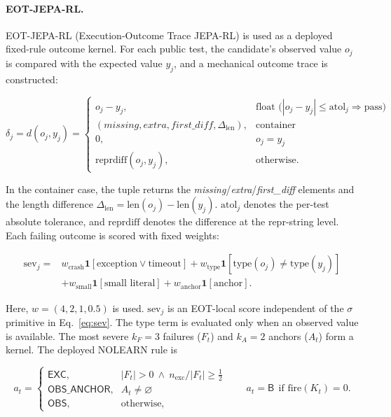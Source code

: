 \documentclass{article}
\numberwithin{equation}{section}  %
\theoremstyle{definition}
\newcommand{\armB}{\textsf{B}}
\begin{document}
\paragraph{EOT-JEPA-RL.}
EOT-JEPA-RL (Execution-Outcome Trace JEPA-RL) is used as a deployed fixed-rule outcome
kernel. For each public test, the candidate's observed value $o_j$ is compared with the
expected value $y_j$, and a mechanical outcome trace is constructed:

\begin{equation}\label{eq:eot-delta}
\delta_j=d(o_j,y_j)=
\begin{cases}
o_j-y_j,&\text{float (}|o_j-y_j|\le \mathrm{atol}_j\Rightarrow \text{pass)}\\[2pt]
(\textit{missing},\textit{extra},\textit{first\_diff},\Delta_{\mathrm{len}}),&\text{container}\\[2pt]
0,&o_j=y_j\\[2pt]
\mathrm{reprdiff}(o_j,y_j),&\text{otherwise.}
\end{cases}
\end{equation}

In the container case, the tuple returns the
\textit{missing}/\textit{extra}/\textit{first\_diff} elements and the length difference
$\Delta_{\mathrm{len}}=\mathrm{len}(o_j)-\mathrm{len}(y_j)$. $\mathrm{atol}_j$ denotes the
per-test absolute tolerance, and $\mathrm{reprdiff}$ denotes the difference at the repr-string
level. Each failing outcome is scored with fixed weights:

\begin{equation}\label{eq:eot-sev}
\begin{aligned}
\mathrm{sev}_j={}&w_{\mathrm{crash}}\mathbf{1}[\text{exception}\lor\text{timeout}]
+w_{\mathrm{type}}\mathbf{1}[\mathrm{type}(o_j)\!\ne\!\mathrm{type}(y_j)]\\
&+w_{\mathrm{small}}\mathbf{1}[\text{small literal}]
+w_{\mathrm{anchor}}\mathbf{1}[\text{anchor}] .
\end{aligned}
\end{equation}

Here, $w=(4,2,1,0.5)$ is used. $\mathrm{sev}_j$ is an EOT-local score independent of the
$\sigma$ primitive in Eq.~\eqref{eq:sev}. The type term is evaluated only when an observed
value is available. The most severe $k_F{=}3$ failures ($F_t$) and $k_A{=}2$ anchors
($A_t$) form a kernel. The deployed NOLEARN rule is

\begin{equation}\label{eq:eot-rule}
a_t=
\begin{cases}
\textsf{EXC},& |F_t|>0\ \wedge\ n_{\mathrm{exc}}/|F_t|\ge \tfrac{1}{2}\\[2pt]
\textsf{OBS\_ANCHOR},& A_t\ne\varnothing\\[2pt]
\textsf{OBS},&\text{otherwise,}
\end{cases}
\qquad a_t=\armB\ \ \text{if } \mathrm{fire}(K_t)=0 .
\end{equation}
\end{document}
